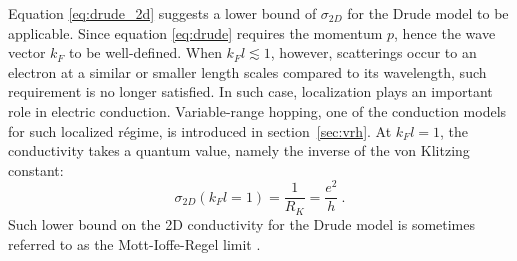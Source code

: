 Equation \ref{eq:drude_2d} suggests a lower bound of $\sigma_{2D}$ for the Drude model to be applicable. Since equation \ref{eq:drude} requires the momentum $p$, hence the wave vector $k_F$ to be well-defined. When $k_F l \lesssim 1$, however, scatterings occur to an electron at a similar or smaller length scales compared to its wavelength, such requirement is no longer satisfied. In such case, localization plays an important role in electric conduction. Variable-range hopping, one of the conduction models for such localized r\'egime, is introduced in section~\ref{sec:vrh}. At $k_F l = 1$, the conductivity takes a quantum value, namely the inverse of the von Klitzing constant:%
\begin{equation}
    \sigma_{2D}(k_F l = 1) = \frac{1}{R_K} = \frac{e^2}{h}~.
\end{equation}%
Such lower bound on the 2D conductivity for the Drude model is sometimes referred to as the Mott-Ioffe-Regel limit \cite{mott_book, hussey2004}.